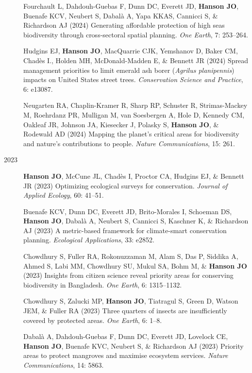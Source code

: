 \documentclass[12pt,a4paper]{article}
\begin{document}
\begin{description}
\item[] Fourchault L, Dahdouh-Guebas F, Dunn DC, Everett JD, \textbf{Hanson JO}, Buenafe KCV, Neubert S, Dabalà A, Yapa KKAS, Cannicci S, \& Richardson AJ (2024) Generating affordable protection of high seas biodiversity through cross-sectoral spatial planning. \textit{One Earth}, 7: 253--264.

\item[] Hudgins EJ, \textbf{Hanson JO}, MacQuarrie CJK, Yemshanov D, Baker CM, Chadès I., Holden MH, McDonald-Madden E, \& Bennett JR (2024) Spread management priorities to limit emerald ash borer (\textit{Agrilus planipennis}) impacts on United States street trees. \textit{Conservation Science and Practice}, 6: e13087.

\item[] Neugarten RA, Chaplin-Kramer R, Sharp RP, Schuster R, Strimas-Mackey M, Roehrdanz PR, Mulligan M, van Soesbergen A, Hole D, Kennedy CM, Oakleaf JR, Johnson JA, Kiesecker J, Polasky S, \textbf{Hanson JO}, \& Rodewald AD (2024) Mapping the planet's critical areas for biodiversity and nature's contributions to people. \textit{Nature Communications}, 15: 261.

\item[2023] \textbf{Hanson JO}, McCune JL, Chadès I, Proctor CA, Hudgins EJ, \& Bennett JR (2023) Optimizing ecological surveys for conservation. \textit{Journal of Applied Ecology}, 60: 41--51.

\item[] Buenafe KCV, Dunn DC, Everett JD, Brito-Morales I, Schoeman DS, \textbf{Hanson JO}, Dabalà A, Neubert S, Cannicci S, Kaschner K, \& Richardson AJ (2023) A metric-based framework for climate-smart conservation planning. \textit{Ecological Applications}, 33: e2852.

\item[] Chowdhury S, Fuller RA, Rokonuzzaman M, Alam S, Das P, Siddika A, Ahmed S, Labi MM, Chowdhury SU, Mukul SA, Bohm M, \& \textbf{Hanson JO} (2023) Insights from citizen science reveal priority areas for conserving biodiversity in Bangladesh. \textit{One Earth}, 6: 1315--1132.

\item[] Chowdhury S, Zalucki MP, \textbf{Hanson JO}, Tiatragul S, Green D, Watson JEM, \& Fuller RA (2023) Three quarters of insects are insufficiently covered by protected areas. \textit{One Earth}, 6: 1--8.

\item[] Dabalà A, Dahdouh-Guebas F, Dunn DC, Everett JD, Lovelock CE, \textbf{Hanson JO}, Buenafe KVC, Neubert S, \& Richardson AJ (2023) Priority areas to protect mangroves and maximise ecosystem services. \textit{Nature Communications}, 14: 5863.


\end{description}
\end{document}

